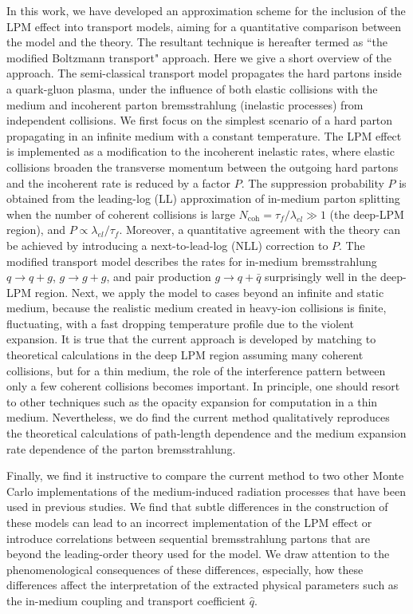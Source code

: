 \documentclass[aps, prc, reprint, amsmath, groupedaddress, nofootinbib]{revtex4-1}
\begin{document}
In this work, we have developed an approximation scheme for the inclusion of the LPM effect into transport models, aiming for a quantitative comparison between the model and the theory.
The resultant technique is hereafter termed as ``the modified Boltzmann transport" approach.
Here we give a short overview of the approach. 
The semi-classical transport model propagates the hard partons inside a quark-gluon plasma, under the influence of both elastic collisions with the medium and incoherent parton bremsstrahlung (inelastic processes) from independent collisions.
We first focus on the simplest scenario of a hard parton propagating in an infinite medium with a constant temperature.
The LPM effect is implemented as a modification to the incoherent inelastic rates, where elastic collisions broaden the transverse momentum between the outgoing hard partons and the incoherent rate is reduced by a factor $P$.
The suppression probability $P$ is obtained from the leading-log (LL) approximation of in-medium parton splitting when the number of coherent collisions is large $N_{\textrm{coh}} = \tau_f/\lambda_{el} \gg 1$ (the deep-LPM region), and $P \propto \lambda_{el}/\tau_f$.
Moreover, a quantitative agreement with the theory can be achieved by introducing a next-to-lead-log (NLL) correction to $P$.
The modified transport model describes the rates for in-medium bremsstrahlung $q\rightarrow q+g$, $g\rightarrow g+g$, and pair production $g\rightarrow q+\bar{q}$ surprisingly well in the deep-LPM region.
Next, we apply the model to cases beyond an infinite and static medium, because the realistic medium created in heavy-ion collisions is finite, fluctuating, with a fast dropping temperature profile due to the violent expansion. 
It is true that the current approach is developed by matching to theoretical calculations in the deep LPM region assuming many coherent collisions, but for a thin medium, the role of the interference pattern between only a few coherent collisions becomes important.
In principle, one should resort to other techniques such as the opacity expansion \cite{Wiedemann:2000za,Gyulassy:1999zd} for computation in a thin medium. 
Nevertheless, we do find the current method qualitatively reproduces the theoretical calculations of path-length dependence \cite{CaronHuot:2010bp} and the medium expansion rate dependence \cite{Baier:1998yf} of the parton bremsstrahlung.

Finally, we find it instructive to compare the current method to two other Monte Carlo implementations of the medium-induced radiation processes that have been used in previous studies.
We find that subtle differences in the construction of these models can lead to an incorrect implementation of the LPM effect or introduce correlations between sequential bremsstrahlung partons that are beyond the leading-order theory used for the model.
We draw attention to the phenomenological consequences of these differences,
especially, how these differences affect the interpretation of the extracted physical parameters such as the in-medium coupling and transport coefficient $\hat{q}$.
\end{document}
